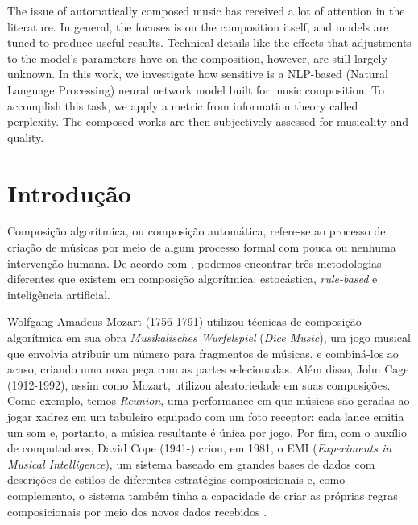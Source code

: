 \documentclass{automatextcc}
\begin{document}
\begin{englishabstract}
The issue of automatically composed music has received a lot of attention in the literature. In general, the focuses is on the composition itself, and models are tuned to produce useful results. Technical details like the effects that adjustments to the model's parameters have on the composition, however, are still largely unknown. In this work, we investigate how sensitive is a NLP-based (Natural Language Processing) neural network model built for music composition. To accomplish this task, we apply a metric from information theory called perplexity. The composed works are then subjectively assessed for musicality and quality.
\end{englishabstract}

\tableofcontents

\listoffigures

\listoftables



\chapter{Introdução}
Composição algorítmica, ou composição automática, refere-se ao processo de criação de músicas por meio de algum processo formal com pouca ou nenhuma intervenção humana. De acordo com \citet{maurer}, podemos encontrar três metodologias diferentes que existem em composição algorítmica: estocástica, \textit{rule-based} e inteligência artificial.

Wolfgang Amadeus Mozart (1756-1791) utilizou técnicas de composição algorítmica em sua obra \textit{Musikalisches Wurfelspiel} (\textit{Dice Music}), um jogo musical que envolvia atribuir um número para fragmentos de músicas, e combiná-los ao acaso, criando uma nova peça com as partes selecionadas. Além disso, John Cage (1912-1992), assim como Mozart, utilizou aleatoriedade em suas composições. Como exemplo, temos \textit{Reunion}, uma performance em que músicas são geradas ao jogar xadrez em um tabuleiro equipado com um foto receptor: cada lance emitia um som e, portanto, a música resultante é única por jogo. Por fim, com o auxílio de computadores, David Cope (1941-) criou, em 1981, o EMI (\textit{Experiments in Musical Intelligence}), um sistema baseado em grandes bases de dados com descrições de estilos de diferentes estratégias composicionais e, como complemento, o sistema também tinha a capacidade de criar as próprias regras composicionais por meio dos novos dados recebidos \citep{alpern1995, maurer}. 
\end{document}
